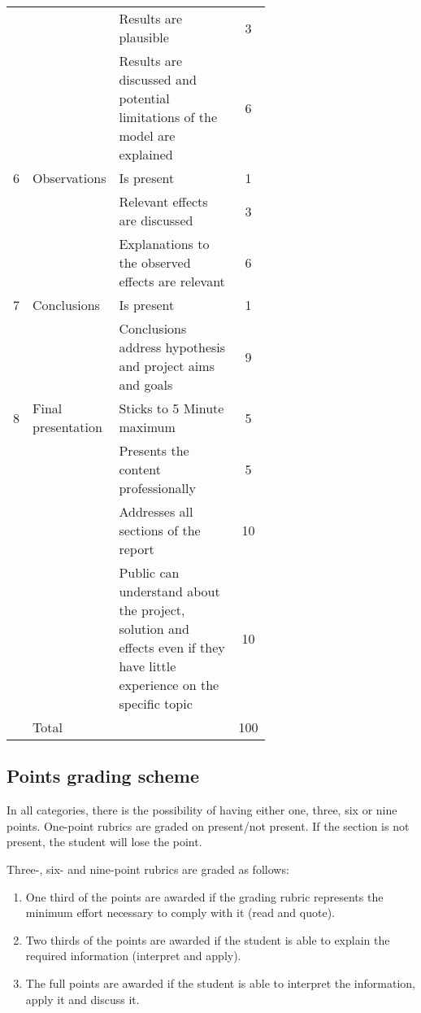 \documentclass[a4paper, 10pt]{IEEEtran}
\begin{document}
\begin{table*}[h]
\begin{tabular}{l p{0.13\linewidth} p{0.5\linewidth} c}
			\cline{3-4}
			  & & Results are plausible & 3\\
			\cline{3-4}
			  & & Results are discussed and potential limitations of the model are explained & 6\\
			 \hline
			 6 & Observations & Is present & 1\\
			\cline{3-4}
			& & Relevant effects are discussed & 3\\
			\cline{3-4}
			& & Explanations to the observed effects are relevant & 6\\
			\hline
			7 & Conclusions & Is present & 1 \\
			\cline{3-4}
			& & Conclusions address hypothesis and project aims and goals & 9 \\
			\hline
			8 & Final presentation & Sticks to 5 Minute maximum & 5 \\
			\cline{3-4}
			&& Presents the content professionally & 5\\
			\cline{3-4}
			&& Addresses all sections of the report & 10 \\
			\cline{3-4}
			&& Public can understand about the project, solution and effects even if they have little experience on the specific topic & 10\\
			\hline
			\hline
			 & Total & & 100 \\
		\end{tabular}
	\end{table*}

	\subsection{Points grading scheme}
	
	In all categories, there is the possibility of having either one, three, six or nine points. One-point rubrics are graded on present/not present. If the section is not present, the student will lose the point.
	
	Three-, six- and nine-point rubrics are graded as follows:
	
	\begin{enumerate}
		\item One third of the points are awarded if the grading rubric represents the minimum effort necessary to comply with it (read and quote).
		\item Two thirds of the points are awarded if the student is able to explain the required information  (interpret and apply).
		\item The full points are awarded if the student is able to interpret the information, apply it and discuss it.
	\end{enumerate}
\end{document}
